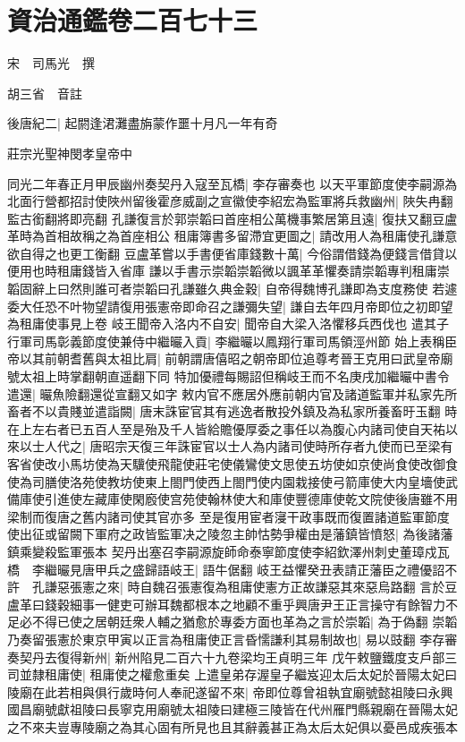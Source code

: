 \chapter{資治通鑑卷二百七十三}
宋　司馬光　撰

胡三省　音註

後唐紀二|{
	起閼逢涒灘盡旃蒙作噩十月凡一年有奇}


莊宗光聖神閔孝皇帝中

同光二年春正月甲辰幽州奏契丹入寇至瓦橋|{
	李存審奏也}
以天平軍節度使李嗣源為北面行營都招討使陜州留後霍彦威副之宣徽使李紹宏為監軍將兵救幽州|{
	陜失冉翻監古銜翻將即亮翻}
孔謙復言於郭崇韜曰首座相公萬機事繁居第且遠|{
	復扶又翻豆盧革時為首相故稱之為首座相公}
租庸簿書多留滯宜更圖之|{
	請改用人為租庸使孔謙意欲自得之也更工衡翻}
豆盧革嘗以手書便省庫錢數十萬|{
	今俗謂借錢為便錢言借貸以便用也時租庸錢皆入省庫}
謙以手書示崇韜崇韜微以諷革革懼奏請崇韜專判租庸崇韜固辭上曰然則誰可者崇韜曰孔謙雖久典金穀|{
	自帝得魏博孔謙即為支度務使}
若遽委大任恐不叶物望請復用張憲帝即命召之謙彌失望|{
	謙自去年四月帝即位之初即望為租庸使事見上卷}
岐王聞帝入洛内不自安|{
	聞帝自大梁入洛懼移兵西伐也}
遣其子行軍司馬彰義節度使兼侍中繼曮入貢|{
	李繼曮以鳳翔行軍司馬領涇州節}
始上表稱臣帝以其前朝耆舊與太祖比肩|{
	前朝謂唐僖昭之朝帝即位追尊考晉王克用曰武皇帝廟號太祖上時掌翻朝直遥翻下同}
特加優禮每賜詔但稱岐王而不名庚戌加繼曮中書令遣還|{
	曮魚險翻還從宣翻又如字}
敕内官不應居外應前朝内官及諸道監軍并私家先所畜者不以貴賤並遣詣闕|{
	唐末誅宦官其有逃逸者散投外鎮及為私家所養畜旴玉翻}
時在上左右者已五百人至是殆及千人皆給贍優厚委之事任以為腹心内諸司使自天祐以來以士人代之|{
	唐昭宗天復三年誅宦官以士人為内諸司使時所存者九使而已至梁有客省使改小馬坊使為天驥使飛龍使莊宅使儀鸞使文思使五坊使如京使尚食使改御食使為司膳使洛苑使教坊使東上閤門使西上閤門使内園栽接使弓箭庫使大内皇墻使武備庫使引進使左藏庫使閑廏使宫苑使翰林使大和庫使豐德庫使乾文院使後唐雖不用梁制而復唐之舊内諸司使其官亦多}
至是復用宦者寖干政事既而復置諸道監軍節度使出征或留闕下軍府之政皆監軍决之陵忽主帥怙勢爭權由是藩鎮皆憤怒|{
	為後諸藩鎮乘變殺監軍張本}
契丹出塞召李嗣源旋師命泰寧節度使李紹欽澤州刺史董璋戍瓦橋　李繼曮見唐甲兵之盛歸語岐王|{
	語牛倨翻}
岐王益懼癸丑表請正藩臣之禮優詔不許　孔謙惡張憲之來|{
	時自魏召張憲復為租庸使憲方正故謙惡其來惡烏路翻}
言於豆盧革曰錢穀細事一健吏可辦耳魏都根本之地顧不重乎興唐尹王正言操守有餘智力不足必不得已使之居朝廷衆人輔之猶愈於專委方面也革為之言於崇韜|{
	為于偽翻}
崇韜乃奏留張憲於東京甲寅以正言為租庸使正言昏懦謙利其易制故也|{
	易以豉翻}
李存審奏契丹去復得新州|{
	新州陷見二百六十九卷梁均王貞明三年}
戊午敕鹽鐵度支戶部三司並隸租庸使|{
	租庸使之權愈重矣}
上遣皇弟存渥皇子繼岌迎太后太妃於晉陽太妃曰陵廟在此若相與俱行歲時何人奉祀遂留不來|{
	帝即位尊曾祖執宜廟號懿祖陵曰永興國昌廟號獻祖陵曰長寧克用廟號太祖陵曰建極三陵皆在代州雁門縣親廟在晉陽太妃之不來夫豈專陵廟之為其心固有所見也且其辭義甚正為太后太妃俱以憂邑成疾張本}
